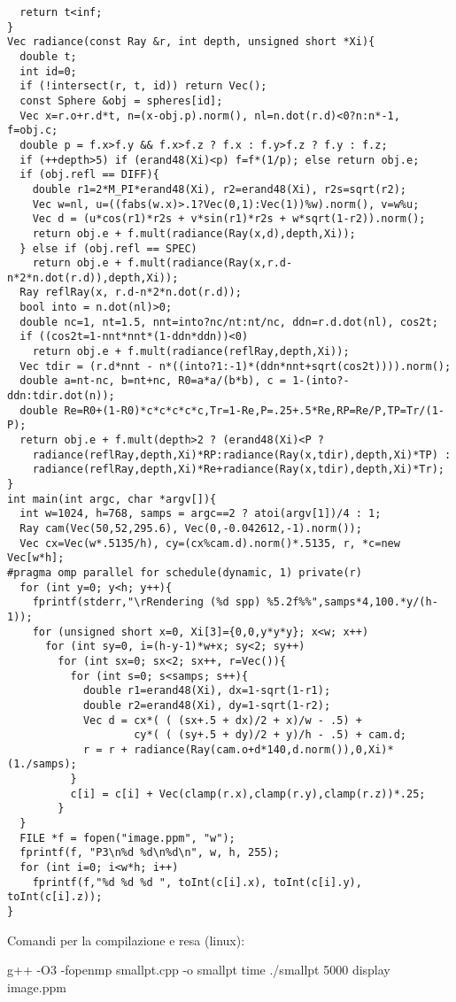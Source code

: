 \begin{verbatim}
  return t<inf; 
} 
Vec radiance(const Ray &r, int depth, unsigned short *Xi){ 
  double t;                               
  int id=0;                               
  if (!intersect(r, t, id)) return Vec(); 
  const Sphere &obj = spheres[id];        
  Vec x=r.o+r.d*t, n=(x-obj.p).norm(), nl=n.dot(r.d)<0?n:n*-1, f=obj.c; 
  double p = f.x>f.y && f.x>f.z ? f.x : f.y>f.z ? f.y : f.z; 
  if (++depth>5) if (erand48(Xi)<p) f=f*(1/p); else return obj.e; 
  if (obj.refl == DIFF){                  
    double r1=2*M_PI*erand48(Xi), r2=erand48(Xi), r2s=sqrt(r2); 
    Vec w=nl, u=((fabs(w.x)>.1?Vec(0,1):Vec(1))%w).norm(), v=w%u; 
    Vec d = (u*cos(r1)*r2s + v*sin(r1)*r2s + w*sqrt(1-r2)).norm(); 
    return obj.e + f.mult(radiance(Ray(x,d),depth,Xi)); 
  } else if (obj.refl == SPEC)            
    return obj.e + f.mult(radiance(Ray(x,r.d-n*2*n.dot(r.d)),depth,Xi)); 
  Ray reflRay(x, r.d-n*2*n.dot(r.d));     
  bool into = n.dot(nl)>0;                
  double nc=1, nt=1.5, nnt=into?nc/nt:nt/nc, ddn=r.d.dot(nl), cos2t; 
  if ((cos2t=1-nnt*nnt*(1-ddn*ddn))<0)    
    return obj.e + f.mult(radiance(reflRay,depth,Xi)); 
  Vec tdir = (r.d*nnt - n*((into?1:-1)*(ddn*nnt+sqrt(cos2t)))).norm(); 
  double a=nt-nc, b=nt+nc, R0=a*a/(b*b), c = 1-(into?-ddn:tdir.dot(n)); 
  double Re=R0+(1-R0)*c*c*c*c*c,Tr=1-Re,P=.25+.5*Re,RP=Re/P,TP=Tr/(1-P); 
  return obj.e + f.mult(depth>2 ? (erand48(Xi)<P ?   
    radiance(reflRay,depth,Xi)*RP:radiance(Ray(x,tdir),depth,Xi)*TP) : 
    radiance(reflRay,depth,Xi)*Re+radiance(Ray(x,tdir),depth,Xi)*Tr); 
} 
int main(int argc, char *argv[]){ 
  int w=1024, h=768, samps = argc==2 ? atoi(argv[1])/4 : 1; 
  Ray cam(Vec(50,52,295.6), Vec(0,-0.042612,-1).norm()); 
  Vec cx=Vec(w*.5135/h), cy=(cx%cam.d).norm()*.5135, r, *c=new Vec[w*h]; 
#pragma omp parallel for schedule(dynamic, 1) private(r)       
  for (int y=0; y<h; y++){                       
    fprintf(stderr,"\rRendering (%d spp) %5.2f%%",samps*4,100.*y/(h-1)); 
    for (unsigned short x=0, Xi[3]={0,0,y*y*y}; x<w; x++)   
      for (int sy=0, i=(h-y-1)*w+x; sy<2; sy++)     
        for (int sx=0; sx<2; sx++, r=Vec()){        
          for (int s=0; s<samps; s++){ 
            double r1=erand48(Xi), dx=1-sqrt(1-r1); 
            double r2=erand48(Xi), dy=1-sqrt(1-r2); 
            Vec d = cx*( ( (sx+.5 + dx)/2 + x)/w - .5) + 
                    cy*( ( (sy+.5 + dy)/2 + y)/h - .5) + cam.d; 
            r = r + radiance(Ray(cam.o+d*140,d.norm()),0,Xi)*(1./samps); 
          } 
          c[i] = c[i] + Vec(clamp(r.x),clamp(r.y),clamp(r.z))*.25; 
        } 
  } 
  FILE *f = fopen("image.ppm", "w");         
  fprintf(f, "P3\n%d %d\n%d\n", w, h, 255); 
  for (int i=0; i<w*h; i++) 
    fprintf(f,"%d %d %d ", toInt(c[i].x), toInt(c[i].y), toInt(c[i].z)); 
} 
\end{verbatim}
Comandi per la compilazione e resa (linux):
\begin{verbatim*}
g++ -O3 -fopenmp smallpt.cpp -o smallpt 
time ./smallpt 5000
display image.ppm
\end{verbatim*}

